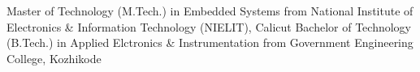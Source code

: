 %
%
%


\begin{scholarship}
        {Master of Technology (M.Tech.) in Embedded Systems from
        \newline
        National Institute of Electronics \& Information Technology (NIELIT), Calicut}
        \scholarshipentry{}{}
        {Bachelor of Technology (B.Tech.) in Applied Elctronics \& Instrumentation from
        \newline
        Government Engineering College, Kozhikode}
\end{scholarship}